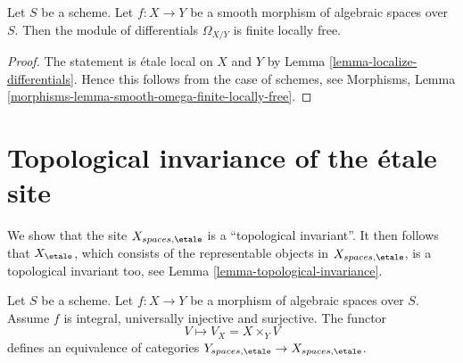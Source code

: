 \begin{lemma}
\label{lemma-smooth-omega-finite-locally-free}
Let $S$ be a scheme.
Let $f : X \to Y$ be a smooth morphism of algebraic spaces over $S$.
Then the module of differentials $\Omega_{X/Y}$
is finite locally free.
\end{lemma}

\begin{proof}
The statement is \'etale local on $X$ and $Y$ by
Lemma \ref{lemma-localize-differentials}.
Hence this follows from the case of schemes, see
Morphisms, Lemma \ref{morphisms-lemma-smooth-omega-finite-locally-free}.
\end{proof}













\section{Topological invariance of the \'etale site}
\label{section-topological-invariance}

\noindent
We show that the site $X_{spaces, \etale}$ is a ``topological
invariant''. It then follows that $X_\etale$, which
consists of the representable objects in $X_{spaces, \etale}$,
is a topological invariant too, see Lemma \ref{lemma-topological-invariance}.

\begin{theorem}
\label{theorem-topological-invariance}
Let $S$ be a scheme.
Let $f : X \to Y$ be a morphism of algebraic spaces over $S$.
Assume $f$ is integral, universally injective and surjective.
The functor
$$
V \longmapsto V_X = X \times_Y V
$$
defines an equivalence of categories
$Y_{spaces, \etale} \to X_{spaces, \etale}$.
\end{theorem}

